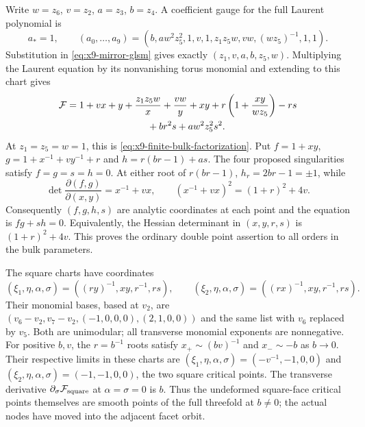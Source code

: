 Write $w=z_6$, $v=z_2$, $a=z_3$, $b=z_4$. A coefficient gauge
for the full Laurent polynomial is
\begin{equation}
 a_*=1,\qquad
 (a_0,\ldots,a_9)=
 (b,aw^2z_5^2,1,v,1,z_1z_5w,vw,(wz_5)^{-1},1,1).
 \label{eq:x9-bulk-coefficient-gauge}
\end{equation}
Substitution in \eqref{eq:x9-mirror-glsm} gives exactly
$(z_1,v,a,b,z_5,w)$. Multiplying the Laurent equation by its
nonvanishing torus monomial and extending to this chart gives
\begin{equation}
 \begin{split}
 \mathcal F={}&1+vx+y+\frac{z_1z_5w}{x}+\frac{vw}{y}+xy
       +r\left(1+\frac{xy}{wz_5}\right)-rs\vphantom{\frac11}\\
       &\hspace{25mm}+br^2s+aw^2z_5^2s^2.
 \end{split}
 \label{eq:x9-full-bulk-chart}
\end{equation}
At $z_1=z_5=w=1$, this is \eqref{eq:x9-finite-bulk-factorization}.
Put $f=1+xy$, $g=1+x^{-1}+vy^{-1}+r$ and
$h=r(br-1)+as$. The four proposed singularities satisfy
$f=g=s=h=0$. At either root of $r(br-1)$,
$h_r=2br-1=\pm1$, while
\begin{equation}
 \det\frac{\partial(f,g)}{\partial(x,y)}
       =x^{-1}+vx,\qquad
 (x^{-1}+vx)^2=(1+r)^2+4v.
 \label{eq:x9-bulk-node-transversality}
\end{equation}
Consequently $(f,g,h,s)$ are analytic coordinates at each point
and the equation is $fg+sh=0$. Equivalently, the Hessian
determinant in $(x,y,r,s)$ is $(1+r)^2+4v$. This proves the
ordinary double point assertion to all orders in the bulk
parameters.

The square charts have coordinates
\begin{equation}
 (\xi_1,\eta,\alpha,\sigma)
   =((ry)^{-1},xy,r^{-1},rs),\qquad
 (\xi_2,\eta,\alpha,\sigma)
   =((rx)^{-1},xy,r^{-1},rs).
 \label{eq:x9-bulk-square-charts}
\end{equation}
Their monomial bases, based at $v_2$, are
$(v_6-v_2,v_7-v_2,(-1,0,0,0),(2,1,0,0))$ and the same list
with $v_6$ replaced by $v_5$. Both are unimodular; all transverse
monomial exponents are nonnegative. For positive $b,v$, the
$r=b^{-1}$ roots satisfy
$x_+\sim(bv)^{-1}$ and $x_-\sim-b$ as $b\to0$.
Their respective limits in these charts are
$(\xi_1,\eta,\alpha,\sigma)=(-v^{-1},-1,0,0)$ and
$(\xi_2,\eta,\alpha,\sigma)=(-1,-1,0,0)$, the two square
critical points. The transverse derivative
$\partial_\sigma\mathcal F_{\rm square}$ at
$\alpha=\sigma=0$ is $b$. Thus the undeformed square-face
critical points themselves are smooth points of the full
threefold at $b\neq0$; the actual nodes have moved into the
adjacent facet orbit.

